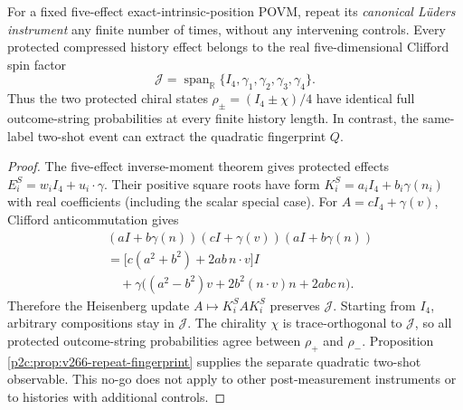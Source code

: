 \documentclass[12pt,a4paper]{article}
\begin{document}
\begin{theorem}
\label{p4a:thm:v266-lueders-blindness}
For a fixed five-effect exact-intrinsic-position POVM, repeat its
\emph{canonical L\"uders instrument} any finite number of times,
without any intervening controls. Every protected compressed history
effect belongs to the real five-dimensional Clifford spin factor
\[
\mathcal J=\operatorname{span}_{\mathbb R}
\{I_4,\gamma_1,\gamma_2,\gamma_3,\gamma_4\}.
\]
Thus the two protected chiral states
$\rho_\pm=(I_4\pm\chi)/4$ have identical full outcome-string
probabilities at every finite history length. In contrast, the
same-label two-shot event can extract the quadratic fingerprint $Q$.
\end{theorem}
\begin{proof}
The five-effect inverse-moment theorem gives protected effects
$E_i^S=w_iI_4+u_i\cdot\gamma$. Their positive square roots have
form $K_i^S=a_iI_4+b_i\gamma(n_i)$ with real coefficients (including
the scalar special case). For $A=cI_4+\gamma(v)$,
Clifford anticommutation gives
\[
\begin{split}
&(aI+b\gamma(n))(cI+\gamma(v))(aI+b\gamma(n))\\
&=\bigl[c(a^2+b^2)+2ab\,n\cdot v\bigr]I\\
&\quad+\gamma\bigl((a^2-b^2)v+2b^2(n\cdot v)n+2abc\,n\bigr).
\end{split}
\]
Therefore the Heisenberg update $A\mapsto K_i^SAK_i^S$
preserves $\mathcal J$. Starting from $I_4$, arbitrary compositions
stay in $\mathcal J$. The chirality $\chi$ is trace-orthogonal to
$\mathcal J$, so all protected outcome-string probabilities agree
between $\rho_+$ and $\rho_-$. Proposition~
\ref{p2c:prop:v266-repeat-fingerprint} supplies the separate
quadratic two-shot observable. This no-go does not apply to other
post-measurement instruments or to histories with additional controls.
\end{proof}
\end{document}
